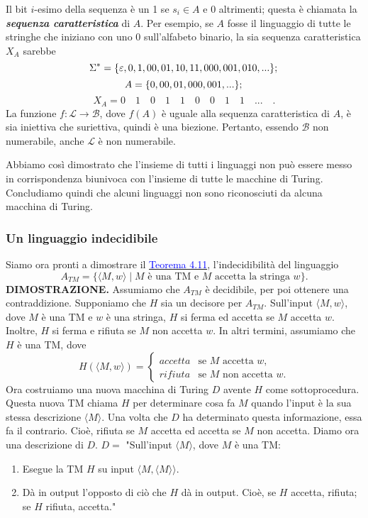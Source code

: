 \documentclass{article}
\begin{document}
Il bit $i$-esimo della sequenza è un 1 se $s_i \in A$ e 0 altrimenti; questa è chiamata la \textbf{\textit{sequenza caratteristica}} di $A$.
Per esempio, se $A$ fosse il linguaggio di tutte le stringhe che iniziano con uno 0 sull'alfabeto binario, la sia sequenza caratteristica $X_A$ sarebbe
$$
\Sigma^* = \{\varepsilon, 0, 1, 00, 01, 10, 11, 000, 001, 010, ...\}; \\
$$
$$
A = \{ 0, 00,01, 000, 001,...\}; \\
$$
$$
X_A = 0\quad 1\quad 0\quad 1\quad 1\quad 0\quad 0\quad 1\quad 1\quad ...\quad.
$$
La funzione $f: \mathcal{L} \rightarrow \mathcal{B}$, dove $f(A)$ è uguale alla sequenza caratteristica di $A$, è sia iniettiva che suriettiva, quindi è una biezione.
Pertanto, essendo $\mathcal{B}$ non numerabile, anche $\mathcal{L}$ è non numerabile.

Abbiamo così dimostrato che l'insieme di tutti i linguaggi non può essere messo in corrispondenza biunivoca con l'insieme di tutte le macchine di Turing.
Concludiamo quindi che alcuni linguaggi non sono riconosciuti da alcuna macchina di Turing.

\subsubsection{Un linguaggio indecidibile}
Siamo ora pronti a dimostrare il \hyperref[teorema-4.11]{\textcolor{blue}{Teorema 4.11}}, l'indecidibilità del linguaggio
$$
A_{TM} = \{\langle M,w \rangle \mid M \text{ è una TM e } M \text{ accetta la stringa } w \}.
$$
\vspace{1em}
\text{}
\newline
\hbox{\textbf{DIMOSTRAZIONE.}}
Assumiamo che $A_{TM}$ è decidibile, per poi ottenere una contraddizione.
Supponiamo che $H$ sia un decisore per $A_{TM}$.
Sull'input $\langle M,w \rangle$, dove $M$ è una TM e $w$ è una stringa, $H$ si ferma ed accetta se $M$ accetta $w$.
Inoltre, $H$ si ferma e rifiuta se $M$ non accetta $w$.
In altri termini, assumiamo che $H$ è una TM, dove
$$
H(\langle M,w \rangle) = 
\begin{cases}
    accetta & \text{se } M \text{ accetta } w, \\
    rifiuta & \text{se } M \text{ non accetta } w.
\end{cases}
$$
Ora costruiamo una nuova macchina di Turing $D$ avente $H$ come sottoprocedura.
Questa nuova TM chiama $H$ per determinare cosa fa $M$ quando l'input è la sua stessa descrizione $\langle M \rangle$.
Una volta che $D$ ha determinato questa informazione, essa fa il contrario.
Cioè, rifiuta se $M$ accetta ed accetta se $M$ non accetta. Diamo ora una descrizione di $D$.
\newline
$D = $ "Sull'input $\langle M \rangle$, dove $M$ è una TM:
\begin{enumerate}
    \item Esegue la TM $H$ su input $\langle M,\langle M \rangle \rangle$.
    \item Dà in output l'opposto di ciò che $H$ dà in output. Cioè, se $H$ accetta, rifiuta; se $H$ rifiuta, accetta."
\end{enumerate}
\end{document}
